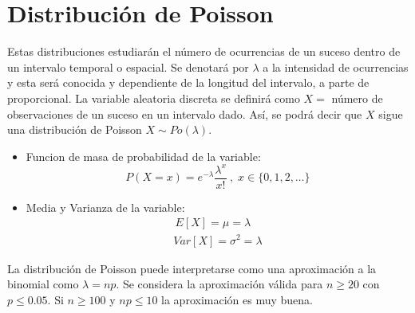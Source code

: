 \documentclass[10pt,a4paper]{book}
\begin{document}
\section{Distribución de Poisson}
Estas distribuciones estudiarán el número de ocurrencias de un suceso dentro de un intervalo temporal o espacial. Se denotará por $\lambda$ a la intensidad de ocurrencias y esta será conocida y dependiente de la longitud del intervalo, a parte de proporcional. La variable aleatoria discreta se definirá como $X=$ número de observaciones de un suceso en un intervalo dado. Así, se podrá decir que $X$ sigue una distribución de Poisson $X\sim Po(\lambda)$.
\begin{itemize}
	\item Funcion de masa de probabilidad de la variable:
		\[P(X=x) = e^{-\lambda}\frac{\lambda^x}{x!}\:,\;x\in\{0,1,2,\dots\}\]
	\item Media y Varianza de la variable:
		\[
			\begin{array}{c}
				\,E[X] = \mu = \lambda\\
				Var[X] = \sigma ^2 = \lambda
			\end{array}
		\]
\end{itemize}
La distribución de Poisson puede interpretarse como una aproximación a la binomial como $\lambda = np$. Se considera la aproximación válida para $n\geq 20$ con $p\leq 0.05$. Si $n\geq 100$ y $np\leq 10$ la aproximación es muy buena.
\end{document}
